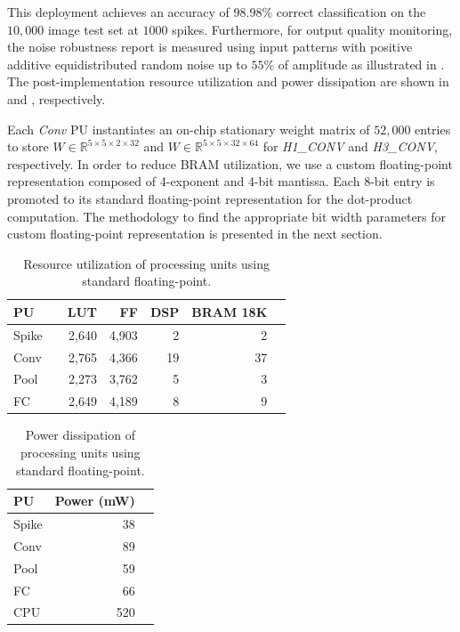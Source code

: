 This deployment achieves an accuracy of $98.98\%$ correct classification on the $10,000$ image test set at $1000$ spikes. Furthermore, for output quality monitoring, the noise robustness report is measured using input patterns with positive additive equidistributed random noise up to $55\%$ of amplitude as illustrated in . The post-implementation resource utilization and power dissipation are shown in  and , respectively.

Each \emph{Conv} PU instantiates an on-chip stationary weight matrix of $52,000$ entries to store $W\in\mathbb{R}^{5\times 5\times 2\times 32}$ and $W\in\mathbb{R}^{5\times 5\times 32\times 64}$ for \emph{H1\_CONV} and \emph{H3\_CONV}, respectively. In order to reduce BRAM utilization, we use a custom floating-point representation composed of 4-exponent and 4-bit mantissa. Each 8-bit entry is promoted to its standard floating-point representation for the dot-product computation. The methodology to find the appropriate bit width parameters for custom floating-point representation is presented in the next section.

\begin{table}[!h]\centering
	\caption{Resource utilization of processing units using standard floating-point.}\label{tab:resource_fp}
	\scriptsize
	\begin{tabular}{lrrrrrr}\toprule
		\textbf{PU} & &\textbf{LUT} &\textbf{FF} &\textbf{DSP} &\textbf{BRAM 18K} \\\midrule
		Spike & &2,640 &4,903 &2 &2 \\
		Conv & &2,765 &4,366 &19 &37 \\
		Pool & &2,273 &3,762 &5 &3 \\
		FC & &2,649 &4,189 &8 &9 \\
		\bottomrule
	\end{tabular}
\end{table}

\begin{table}[!h]\centering
	\caption{Power dissipation of processing units using standard floating-point.}\label{tab:power_fp}
	\scriptsize
	\begin{tabular}{lrr}\toprule
		\textbf{PU} &\textbf{Power (mW)} \\\midrule
		Spike &38 \\
		Conv &89 \\
		Pool &59 \\
		FC &66 \\
		CPU &520 \\
		\bottomrule
	\end{tabular}
\end{table}

